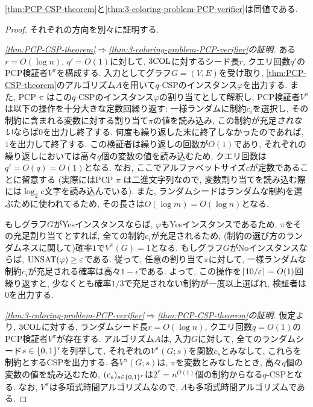 \begin{lemma}{}{}
  \cref{thm:PCP-CSP-theorem}と\cref{thm:3-coloring-problem-PCP-verifier}は同値である.
\end{lemma}
\begin{proof}
  それぞれの方向を別々に証明する.

  \emph{\cref{thm:PCP-CSP-theorem}$\Rightarrow$\cref{thm:3-coloring-problem-PCP-verifier}の証明.}
  ある$r=O(\log n)$, $q'=O(1)$に対して, $\mathrm{3COL}$に対するシード長$r$, クエリ回数$q'$のPCP検証者$V^\pi$を構成する.
  入力としてグラフ$G=(V,E)$を受け取り, \cref{thm:PCP-CSP-theorem}のアルゴリズム$A$を用いて$q$-CSPのインスタンス$\varphi$を出力する.
  また, PCP $\pi$ はこの$q$-CSPのインスタンス$\varphi$の割り当てとして解釈し,
  PCP検証者$V^\pi$は以下の操作を十分大きな定数回繰り返す: 一様ランダムに制約$c_i$を選択し, その制約に含まれる変数に対する割り当て$\pi$の値を読み込み, この制約が充足\emph{されない}ならば$0$を出力し終了する. 何度も繰り返した末に終了しなかったのであれば, $1$を出力して終了する.
  この検証者は繰り返しの回数が$O(1)$であり, それぞれの繰り返しにおいては高々$q$個の変数の値を読み込むため, クエリ回数は$q'=O(q)=O(1)$となる. なお, ここでアルファベットサイズ$c$が定数であることに留意する (実際にはPCP $\pi$ は二進文字列なので, 変数割り当てを読み込む際には$\log_2 c$文字を読み込んでいる).
  また, ランダムシードはランダムな制約を選ぶために使われてるため, その長さは$O(\log m)=O(\log n)$となる.

  もしグラフ$G$がYesインスタンスならば, $\varphi$もYesインスタンスであるため, $\pi$をその充足割り当てとすれば, 全ての制約$c_i$が充足されるため, (制約の選び方のランダムネスに関して)確率$1$で$V^\pi(G)=1$となる.
  もしグラフ$G$がNoインスタンスならば, $\mathrm{UNSAT}(\varphi) \ge \varepsilon$である. 従って, 任意の割り当て$\pi$に対して, 一様ランダムな制約$c_i$が充足される確率は高々$1-\epsilon$である.
  よって, この操作を$\lceil10/\varepsilon\rceil=O(1)$回繰り返すと, 少なくとも確率$1/3$で充足されない制約が一度以上選ばれ, 検証者は$0$を出力する.


  \emph{\cref{thm:3-coloring-problem-PCP-verifier}$\Rightarrow$\cref{thm:PCP-CSP-theorem}の証明.}
  仮定より, $\mathrm{3COL}$に対する, ランダムシード長$r=O(\log n)$, クエリ回数$q=O(1)$のPCP検証者$V^\pi$が存在する. アルゴリズム$A$は, 入力$G$に対して, 全てのランダムシード$s\in \{0,1\}^r$を列挙して, それぞれの$V^\pi(G;s)$を関数$c_s$とみなして, これらを制約とするCSPを出力する. 各$V^\pi(G;s)$は, $\pi$を変数とみなしたとき, 高々$q$個の変数の値を読み込むため, $(c_s)_{s\in\{0,1\}^r}$は$2^r=n^{O(1)}$個の制約からなる$q$-CSPとなる.
  なお, $V^\pi$は多項式時間アルゴリズムなので, $A$も多項式時間アルゴリズムである.
\end{proof}

